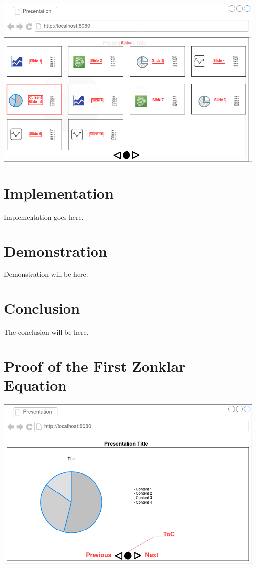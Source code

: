 \documentclass[journal,comsoc]{IEEEtran}
\begin{document}
\includegraphics[scale=0.33]{Mockups/NavigationSystem_2.png}

\section{Implementation}
Implementation goes here.

\section{Demonstration}
Demonstration will be here.

\section{Conclusion}
The conclusion will be here.


\appendices
\section{Proof of the First Zonklar Equation}
\includegraphics[scale=0.2]{Mockups/NavigationSystem_1.png}







\ifCLASSOPTIONcaptionsoff
  \newpage
\fi



\end{document}
